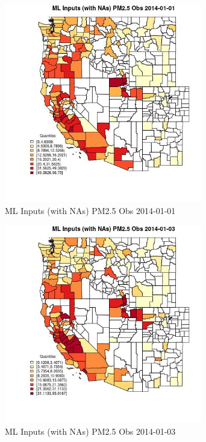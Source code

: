 \begin{figure} 
\centering  
\includegraphics[width=0.77\textwidth]{Code_Outputs/Report_ML_input_PM25_Step4_part_e_de_duplicated_aveswNAs_CountyPM25_ObsMean2014-01-01_2014-01-01.jpg} 
\caption{\label{fig:Report_ML_input_PM25_Step4_part_e_de_duplicated_aveswNAsCountyPM25_ObsMean2014-01-01_2014-01-01}ML Inputs (with NAs) PM2.5 Obs 2014-01-01} 
\end{figure} 
 

\begin{figure} 
\centering  
\includegraphics[width=0.77\textwidth]{Code_Outputs/Report_ML_input_PM25_Step4_part_e_de_duplicated_aveswNAs_CountyPM25_ObsMean2014-01-03_2014-01-03.jpg} 
\caption{\label{fig:Report_ML_input_PM25_Step4_part_e_de_duplicated_aveswNAsCountyPM25_ObsMean2014-01-03_2014-01-03}ML Inputs (with NAs) PM2.5 Obs 2014-01-03} 
\end{figure} 
 

